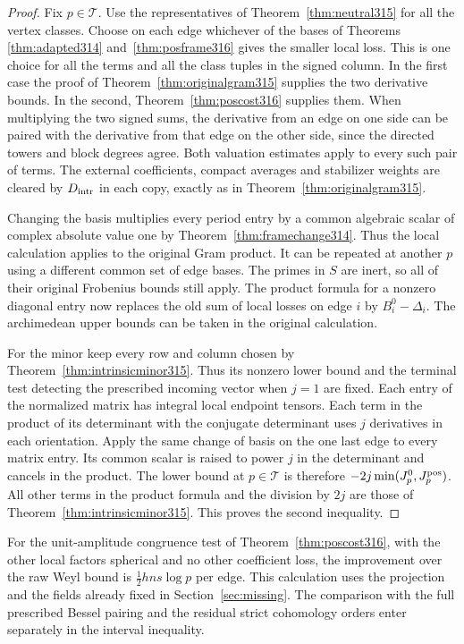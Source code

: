 \documentclass[a4paper,11pt]{article}
\theoremstyle{definition}
\theoremstyle{remark}
\numberwithin{equation}{section}
\begin{document}
\begin{proof}
Fix \(p\in\mathcal T\). Use the representatives of
Theorem~\ref{thm:neutral315} for all the vertex classes. Choose
on each edge whichever of the bases of Theorems
\ref{thm:adapted314} and~\ref{thm:posframe316} gives the
smaller local loss. This is one choice for all the terms and
all the class tuples in the signed column. In the first case
the proof of Theorem~\ref{thm:originalgram315} supplies the
two derivative bounds. In the second,
Theorem~\ref{thm:poscost316} supplies them. When multiplying
the two signed sums, the derivative from an edge on one side
can be paired with the derivative from that edge on the other
side, since the directed towers and block degrees agree.
Both valuation estimates apply to every such pair of terms.
The external coefficients, compact averages and stabilizer
weights are cleared by \(D_{\rm intr}\) in each copy, exactly
as in Theorem~\ref{thm:originalgram315}.

Changing the basis multiplies every period entry by a common
algebraic scalar of complex absolute value one by
Theorem~\ref{thm:framechange314}. Thus the local calculation
applies to the original Gram product. It can be repeated at
another \(p\) using a different common set of edge bases.
The primes in \(S\) are inert, so all of their original
Frobenius bounds still apply. The product formula for a nonzero
diagonal entry now replaces the old sum of local losses on
edge \(i\) by \(B_i^0-\Delta_i\). The archimedean upper
bounds can be taken in the original calculation.

For the minor keep every row and column chosen by
Theorem~\ref{thm:intrinsicminor315}. Thus its nonzero lower
bound and the terminal test detecting the prescribed incoming
vector when \(j=1\) are fixed. Each entry of the normalized
matrix has integral local endpoint tensors. Each term in the
product of its determinant with the conjugate determinant uses
\(j\) derivatives in each orientation. Apply the same change of
basis on the one last edge to every matrix entry. Its common
scalar is raised to power \(j\) in the determinant and cancels
in the product. The lower bound at \(p\in\mathcal T\) is
therefore \(-2j\min(J^0_p,J^{\rm pos}_p)\). All other terms
in the product formula and the division by \(2j\) are those
of Theorem~\ref{thm:intrinsicminor315}. This proves the
second inequality.
\end{proof}

For the unit-amplitude congruence test of
Theorem~\ref{thm:poscost316}, with the other local factors
spherical and no other coefficient loss, the improvement over
the raw Weyl bound is \(\frac12hns\log p\) per edge. This
calculation uses the projection and the fields already fixed in
Section~\ref{sec:missing}. The comparison with the full
prescribed Bessel pairing and the residual strict cohomology
orders enter separately in the interval inequality.
\end{document}
